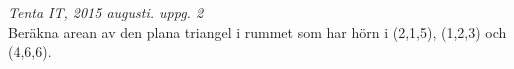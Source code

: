 {\it Tenta IT, 2015 augusti. uppg. 2}\\
Beräkna arean av den plana triangel i rummet som har hörn i (2,1,5), (1,2,3) och (4,6,6).